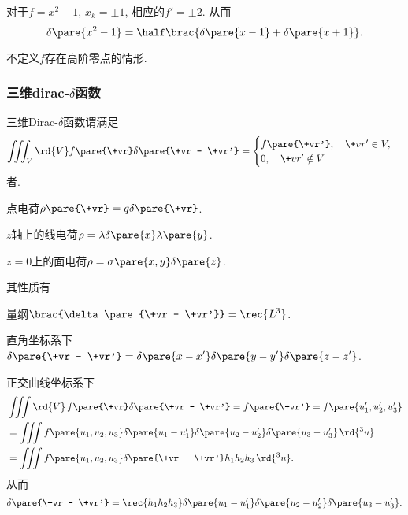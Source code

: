 \documentclass[hidelinks]{ctexart}
\begin{document}
\begin{ex}
    对于$f = x^2 - 1$, $x_k = \pm 1$, 相应的$f' = \pm 2$. 从而
    \[ \delta\pare{x^2 - 1} = \half \brac{\delta\pare{x-1} + \delta\pare{x+1}}. \]
\end{ex}
\begin{remark}
    不定义$f$存在高阶零点的情形.
\end{remark}


\subsubsection{三维dirac-\texorpdfstring{$\delta$}{delta}函数} %
\label{ssub:三维dirac_delta函数}

三维Dirac-$\delta$函数谓满足
\[ \iiint_V \rd{V} f\pare{\+vr} \delta\pare{\+vr - \+vr'} = \begin{cases}
    f\pare{\+vr'},\quad \+vr'\in V,\\
    0,\quad \+vr' \notin V
\end{cases} \]
者.
\begin{ex}
    点电荷$\rho\pare{\+vr} = q\delta\pare{\+vr}$.
\end{ex}
\begin{ex}
    $z$轴上的线电荷$\rho = \lambda \delta\pare{x}\lambda\pare{y}$.
\end{ex}
\begin{ex}
    $z=0$上的面电荷$\rho = \sigma\pare{x,y} \delta\pare{z}$.
\end{ex}
其性质有
\begin{cenum}
    \item 量纲$\displaystyle \brac{\delta\pare{\+vr - \+vr'}} = \rec{L^3}$.
    \item 直角坐标系下$\displaystyle \delta\pare{\+vr - \+vr'} = \delta\pare{x-x'}\delta\pare{y-y'}\delta\pare{z-z'}$.
    \item 正交曲线坐标系下
    \begin{align*}
        &\iiint \rd{V}\,f\pare{\+vr}\delta\pare{\+vr - \+vr'} = f\pare{\+vr'} = f\pare{u'_1,u'_2,u'_3} \\ &= \iiint f\pare{u_1,u_2,u_3}\delta\pare{u_1-u'_1}\delta\pare{u_2-u'_2}\delta\pare{u_3-u'_3}\,\rd{^3u} \\
        &= \iiint f\pare{u_1,u_2,u_3}\delta\pare{\+vr - \+vr'} h_1h_2h_3 \,\rd{^3u}.
    \end{align*}
    从而
    \[ \delta\pare{\+vr - \+vr'} = \rec{h_1h_2h_3} \delta\pare{u_1 - u'_1}\delta\pare{u_2 - u'_2}\delta\pare{u_3 - u'_3}. \]
\end{cenum}
\end{document}

